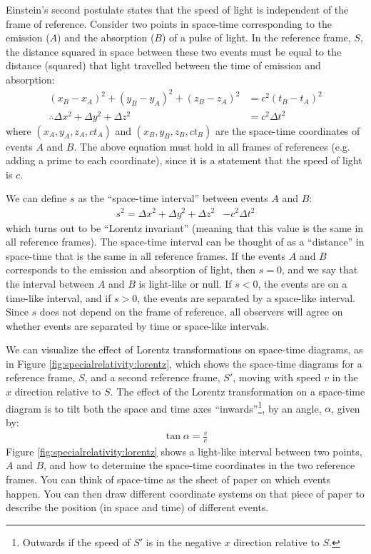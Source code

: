 Einstein's second postulate states that the speed of light is independent of the frame of reference. Consider two points in space-time corresponding to the emission ($A$) and the absorption ($B$) of a pulse of light. In the reference frame, $S$, the distance squared in space between these two events must be equal to the distance (squared) that light travelled between the time of emission and absorption:
\begin{align*}
(x_B-x_A)^2+(y_B-y_A)^2+(z_B-z_A)^2&= c^2(t_B-t_A)^2\\
\therefore \Delta x^2 + \Delta y^2 +\Delta z^2&=c^2\Delta t^2
\end{align*}
where $(x_A,y_A,z_A,ct_A)$ and $(x_B,y_B,z_B,ct_B)$ are the space-time coordinates of events $A$ and $B$. The above equation must hold in all frames of references (e.g. adding a prime to each coordinate), since it is a statement that the speed of light is $c$.

We can define $s$ as the ``space-time interval'' between events $A$ and $B$:
\begin{align*}
s^2 = \Delta x^2 + \Delta y^2 +\Delta z^2&-c^2\Delta t^2
\end{align*}
which turns out to be ``Lorentz invariant'' (meaning that this value is the same in all reference frames). The space-time interval can be thought of as a ``distance'' in space-time that is the same in all reference frames. If the events $A$ and $B$ corresponds to the emission and absorption of light, then $s=0$, and we say that the interval between $A$ and $B$ is light-like or null. If $s<0$, the events are on a time-like interval, and if $s>0$, the events are separated by a space-like interval. Since $s$ does not depend on the frame of reference, all observers will agree on whether events are separated by time or space-like intervals.

We can visualize the effect of Lorentz transformations on space-time diagrams, as in Figure \ref{fig:specialrelativity:lorentz}, which shows the space-time diagrams for a reference frame, $S$, and a second reference frame, $S'$, moving with speed $v$ in the $x$ direction relative to $S$.
The effect of the Lorentz transformation on a space-time diagram is to tilt both the space and time axes ``inwards''\footnote{Outwards if the speed of $S'$ is in the negative $x$ direction relative to $S$.}, by an angle, $\alpha$, given by:
\begin{align*}
\tan\alpha = \frac{v}{c}
\end{align*}
Figure \ref{fig:specialrelativity:lorentz} shows a light-like interval between two points, $A$ and $B$, and how to determine the space-time coordinates in the two reference frames. You can think of space-time as the sheet of paper on which events happen. You can then draw different coordinate systems on that piece of paper to describe the position (in space and time) of different events.



